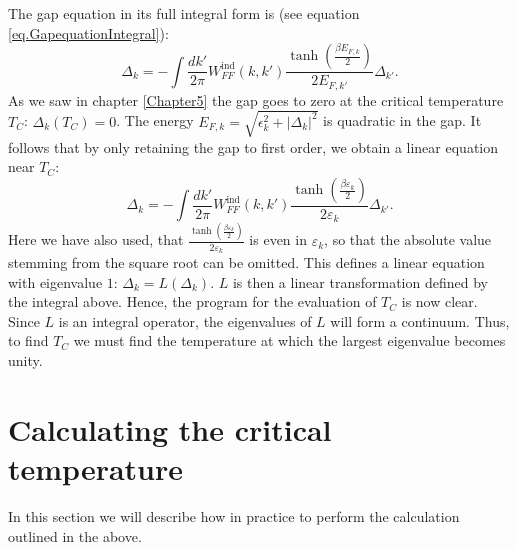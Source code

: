 The gap equation in its full integral form is (see equation \eqref{eq.GapequationIntegral}):
\begin{equation}
\Delta_k = - \int \frac{dk'}{2\pi} W^\text{ind}_{FF}(k,k')\frac{\tanh\left(\frac{\beta E_{F,k}}{2}\right)}{2E_{F,k'}}\Delta_{k'}. \nonumber
\end{equation} 
As we saw in chapter \ref{Chapter5} the gap goes to zero at the critical temperature $T_C$: $\Delta_k(T_C) = 0$. The energy $E_{F,k} = \sqrt{\epsilon_k^2 + |\Delta_k|^2}$ is quadratic in the gap. It follows that by only retaining the gap to first order, we obtain a linear equation near $T_C$:
\begin{equation}
\Delta_k = - \int \frac{dk'}{2\pi} W^\text{ind}_{FF}(k,k')\frac{\tanh\left(\frac{\beta \varepsilon_k}{2}\right)}{2\varepsilon_k} \Delta_{k'}.
\label{eq.GapequationIntegralLinear}
\end{equation} 
Here we have also used, that $\frac{\tanh\left(\frac{\beta \varepsilon_k}{2}\right)}{2\varepsilon_k}$ is even in $\varepsilon_k$, so that the absolute value stemming from the square root can be omitted. This defines a linear equation with eigenvalue $1$: $\Delta_k = L(\Delta_k)$. $L$ is then a linear transformation defined by the integral above. Hence, the program for the evaluation of $T_C$ is now clear. Since $L$ is an integral operator, the eigenvalues of $L$ will form a continuum. Thus, to find $T_C$ we must find the temperature at which the largest eigenvalue becomes unity. 


\section{Calculating the critical temperature} \label{sec.criticaltemperature.numerical}
In this section we will describe how in practice to perform the calculation outlined in the above. 

